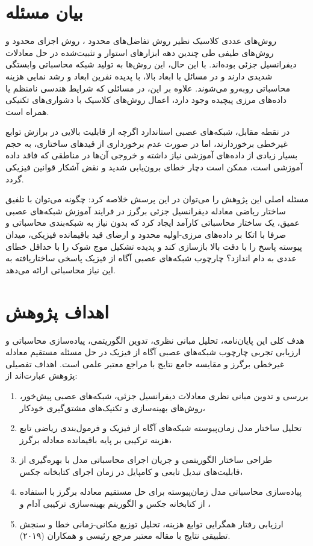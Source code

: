\section{بیان مسئله}
\label{sec:problem}

روش‌های عددی کلاسیک نظیر روش تفاضل‌های محدود \cite{leveque2007}، روش اجزای محدود \cite{zienkiewicz2005} و روش‌های طیفی \cite{trefethen2000} طی چندین دهه ابزارهای استوار و تثبیت‌شده در حل معادلات دیفرانسیل جزئی بوده‌اند. با این حال، این روش‌ها به تولید شبکه محاسباتی وابستگی شدیدی دارند و در مسائل با ابعاد بالا، با پدیده نفرین ابعاد و رشد نمایی هزینه محاسباتی روبه‌رو می‌شوند. علاوه بر این، در مسائلی که شرایط هندسی نامنظم یا داده‌های مرزی پیچیده وجود دارد، اعمال روش‌های کلاسیک با دشواری‌های تکنیکی همراه است.

در نقطه مقابل، شبکه‌های عصبی استاندارد اگرچه از قابلیت بالایی در برازش توابع غیرخطی برخوردارند، اما در صورت عدم برخورداری از قیدهای ساختاری، به حجم بسیار زیادی از داده‌های آموزشی نیاز داشته و خروجی آن‌ها در مناطقی که فاقد داده آموزشی است، ممکن است دچار خطای برون‌یابی شدید و نقض آشکار قوانین فیزیکی گردد.

مسئله اصلی این پژوهش را می‌توان در این پرسش خلاصه کرد: چگونه می‌توان با تلفیق ساختار ریاضی معادله دیفرانسیل جزئی برگرز در فرایند آموزش شبکه‌های عصبی عمیق، یک ساختار محاسباتی کارآمد ایجاد کرد که بدون نیاز به شبکه‌بندی محاسباتی و صرفا با اتکا بر داده‌های مرزی-اولیه محدود و ارضای قید باقیمانده فیزیکی، میدان پیوسته پاسخ را با دقت بالا بازسازی کند و پدیده تشکیل موج شوک را با حداقل خطای عددی به دام اندازد؟ چارچوب شبکه‌های عصبی آگاه از فیزیک \cite{raissi2019} پاسخی ساختاریافته به این نیاز محاسباتی ارائه می‌دهد.

\section{اهداف پژوهش}
\label{sec:goals}

هدف کلی این پایان‌نامه، تحلیل مبانی نظری، تدوین الگوریتمی، پیاده‌سازی محاسباتی و ارزیابی تجربی چارچوب شبکه‌های عصبی آگاه از فیزیک در حل مسئله مستقیم معادله غیرخطی برگرز و مقایسه جامع نتایج با مراجع معتبر علمی است. اهداف تفصیلی پژوهش عبارت‌اند از:

\begin{enumerate}
\item بررسی و تدوین مبانی نظری معادلات دیفرانسیل جزئی، شبکه‌های عصبی پیش‌خور، روش‌های بهینه‌سازی و تکنیک‌های مشتق‌گیری خودکار،
\item تحلیل ساختار مدل زمان‌پیوسته شبکه‌های آگاه از فیزیک و فرمول‌بندی ریاضی تابع هزینه ترکیبی بر پایه باقیمانده معادله برگرز،
\item طراحی ساختار الگوریتمی و جریان اجرای محاسباتی مدل با بهره‌گیری از قابلیت‌های تبدیل تابعی و کامپایل در زمان اجرای کتابخانه جکس،
\item پیاده‌سازی محاسباتی مدل زمان‌پیوسته برای حل مستقیم معادله برگرز با استفاده از کتابخانه جکس و الگوریتم بهینه‌سازی ترکیبی آدام و ،
\item ارزیابی رفتار همگرایی توابع هزینه، تحلیل توزیع مکانی-زمانی خطا و سنجش تطبیقی نتایج با مقاله معتبر مرجع رئیسی و همکاران (۲۰۱۹).
\end{enumerate}

